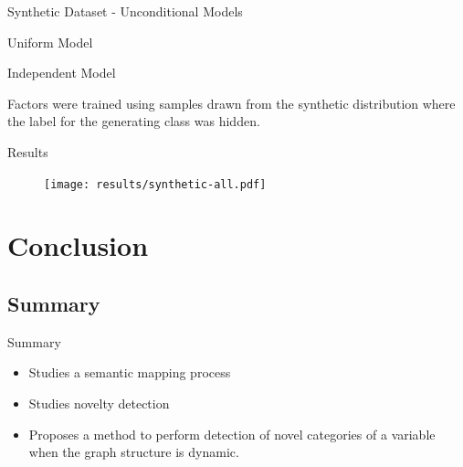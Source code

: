\documentclass[compress]{beamer}
\begin{document}
\begin{frame}{Synthetic Dataset - Unconditional Models}

\begin{block}{Uniform Model}
\centering
{}
\end{block}

\begin{block}{Independent Model}
\centering
{}

Factors were trained using samples drawn from the synthetic distribution where the label
for the generating class was hidden.
\end{block}
\end{frame}

\begin{frame}{Results}
  \begin{figure}
    \texttt{[image: results/synthetic-all.pdf]}
  \end{figure}
\end{frame}


\section{Conclusion}

\subsection{Summary}
\begin{frame}{Summary}
\begin{itemize}
\item Studies a semantic mapping process
\item Studies novelty detection
\item Proposes a method to perform detection of novel categories
      of a variable when the graph structure is dynamic.
\end{itemize}
\end{frame}
\end{document}
